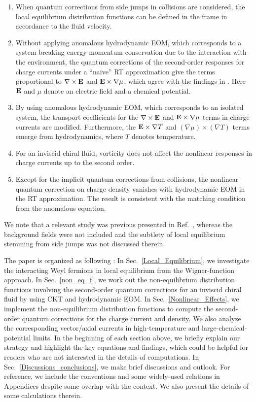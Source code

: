 \documentclass[aps,prd,showkeys,preprint,amsmath,amssymb,nofootinbib]{revtex4-1}
\begin{document}
\begin{enumerate}
	\item
	When quantum corrections from side jumps in collisions are considered, the local equilibrium distribution functions can be defined in the frame in accordance to the fluid velocity.
	\item
	Without applying anomalous hydrodynamic EOM, which corresponds to a system breaking energy-momentum conservation due to the interaction with the environment, the quantum corrections of the second-order responses for charge currents under a ``naive'' RT approximation give the terms proportional to ${\bf\nabla\times E}$ and ${\bf E}\times{\bf \nabla\mu}$, which agree with the findings in \cite{Chen:2016xtg,Gorbar:2016qfh}. Here ${\bf E}$ and $\mu$ denote an electric field and a chemical potential.
	\item
    By using anomalous hydrodynamic EOM, which corresponds to an isolated system, the transport coefficients for the ${\bf\nabla\times E}$ and ${\bf E}\times{\bf \nabla\mu}$ terms in charge currents are modified. Furthermore, the ${\bf E}\times\nabla T$ and $(\nabla \mu)\times(\nabla T)$ terms emerge from hydrodynamics, where $T$ denotes temperature.
	\item
	For an inviscid chiral fluid, vorticity does not affect the nonlinear responses in charge currents up to the second order. 
	\item
	Except for the implicit quantum corrections from collisions, the nonlinear quantum correction on charge density vanishes with hydrodynamic EOM in the RT approximation. The result is consistent with the matching condition from the anomalous equation.   
\end{enumerate}
We note that a relevant study was previous presented in Ref.~\cite{Gorbar:2017toh}, whereas the background fields were not included and the subtlety of local equilibrium stemming from side jumps was not discussed therein. 

The paper is organized as following : In Sec.~\ref{Local_Equilibrium}, we investigate the interacting Weyl fermions in local equilibrium from the Wigner-function approach. %
In Sec.~\ref{non_eq_f}, we work out the non-equilibrium distribution functions involving the second-order quantum corrections for an inviscid chiral fluid by using CKT and hydrodynamic EOM. In Sec.~\ref{Nonlinear_Effects}, we implement the non-equilibrium distribution functions to compute the second-order quantum corrections for the charge current and density. We also analyze the corresponding vector/axial currents in high-temperature and large-chemical-potential limits. In the beginning of each section above, we briefly explain our strategy and highlight the key equations and findings, which could be helpful for readers who are not interested in the details of computations. In Sec.~\ref{Discussions_conclusions}, we make brief discussions and outlook. 
For reference, we include the conventions and some widely-used relations in Appendices despite some overlap with the context. We also present the details of some calculations therein. 
\end{document}
